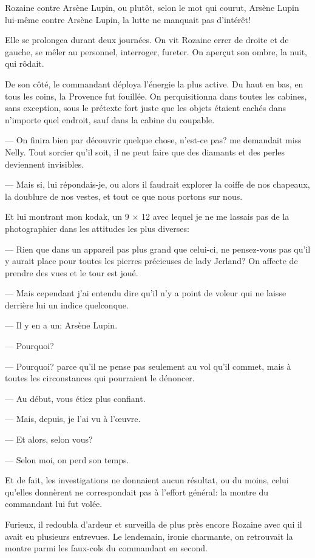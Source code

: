 \documentclass[12pt,a4paper]{book}
\begin{document}
Rozaine contre Arsène Lupin, ou plutôt, selon le mot qui courut, Arsène Lupin lui-même contre Arsène Lupin, la lutte ne manquait pas d’intérêt!

Elle se prolongea durant deux journées. On vit Rozaine errer de droite et de gauche, se mêler au personnel, interroger, fureter. On aperçut son ombre, la nuit, qui rôdait.

De son côté, le commandant déploya l’énergie la plus active. Du haut en bas, en tous les coins, la Provence fut fouillée. On perquisitionna dans toutes les cabines, sans exception, sous le prétexte fort juste que les objets étaient cachés dans n’importe quel endroit, sauf dans la cabine du coupable.

— On finira bien par découvrir quelque chose, n’est-ce pas? me demandait miss Nelly. Tout sorcier qu’il soit, il ne peut faire que des diamants et des perles deviennent invisibles.

— Mais si, lui répondais-je, ou alors il faudrait explorer la coiffe de nos chapeaux, la doublure de nos vestes, et tout ce que nous portons sur nous.

Et lui montrant mon kodak, un 9 × 12 avec lequel je ne me lassais pas de la photographier dans les attitudes les plus diverses:

— Rien que dans un appareil pas plus grand que celui-ci, ne pensez-vous pas qu’il y aurait place pour toutes les pierres précieuses de lady Jerland? On affecte de prendre des vues et le tour est joué.

— Mais cependant j’ai entendu dire qu’il n’y a point de voleur qui ne laisse derrière lui un indice quelconque.

— Il y en a un: Arsène Lupin.

— Pourquoi?

— Pourquoi? parce qu’il ne pense pas seulement au vol qu’il commet, mais à toutes les circonstances qui pourraient le dénoncer.

— Au début, vous étiez plus confiant.

— Mais, depuis, je l’ai vu à l’œuvre.

— Et alors, selon vous?

— Selon moi, on perd son temps.

Et de fait, les investigations ne donnaient aucun résultat, ou du moins, celui qu’elles donnèrent ne correspondait pas à l’effort général: la montre du commandant lui fut volée.

Furieux, il redoubla d’ardeur et surveilla de plus près encore Rozaine avec qui il avait eu plusieurs entrevues. Le lendemain, ironie charmante, on retrouvait la montre parmi les faux-cols du commandant en second.
\end{document}
